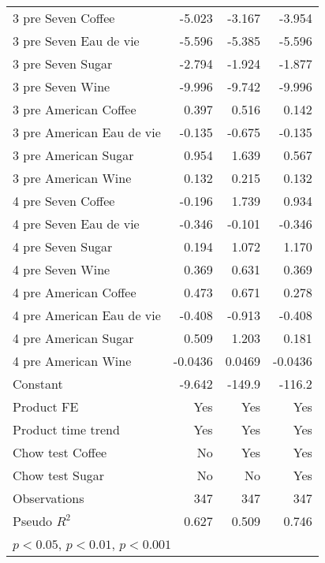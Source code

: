 {\begin{longtable}{l*{3}{D{.}{.}{-1}}}
3 pre Seven Coffee  &      -5.023\sym{***}&      -3.167\sym{***}&      -3.954\sym{***}\\
3 pre Seven Eau de vie&      -5.596\sym{***}&      -5.385\sym{***}&      -5.596\sym{***}\\
3 pre Seven Sugar   &      -2.794\sym{***}&      -1.924\sym{***}&      -1.877\sym{***}\\
3 pre Seven Wine    &      -9.996\sym{***}&      -9.742\sym{***}&      -9.996\sym{***}\\
3 pre American Coffee&       0.397         &       0.516\sym{**} &       0.142         \\
3 pre American Eau de vie&      -0.135         &      -0.675\sym{***}&      -0.135         \\
3 pre American Sugar&       0.954\sym{***}&       1.639\sym{***}&       0.567\sym{***}\\
3 pre American Wine &       0.132         &       0.215         &       0.132         \\
4 pre Seven Coffee  &      -0.196         &       1.739\sym{***}&       0.934\sym{*}  \\
4 pre Seven Eau de vie&      -0.346         &      -0.101         &      -0.346         \\
4 pre Seven Sugar   &       0.194         &       1.072\sym{***}&       1.170\sym{***}\\
4 pre Seven Wine    &       0.369         &       0.631\sym{***}&       0.369         \\
4 pre American Coffee&       0.473         &       0.671\sym{***}&       0.278         \\
4 pre American Eau de vie&      -0.408         &      -0.913\sym{***}&      -0.408         \\
4 pre American Sugar&       0.509\sym{*}  &       1.203\sym{***}&       0.181         \\
4 pre American Wine &     -0.0436         &      0.0469         &     -0.0436         \\
Constant            &      -9.642         &      -149.9\sym{***}&      -116.2\sym{***}\\
Product FE          &         Yes         &         Yes         &         Yes         \\
Product time trend  &         Yes         &         Yes         &         Yes         \\
Chow test Coffee    &          No         &         Yes         &         Yes         \\
Chow test Sugar     &          No         &          No         &         Yes         \\
\midrule
Observations        &         347         &         347         &         347         \\
Pseudo \(R^{2}\)    &       0.627         &       0.509         &       0.746         \\
\bottomrule
{}\\
\end{longtable}
}
